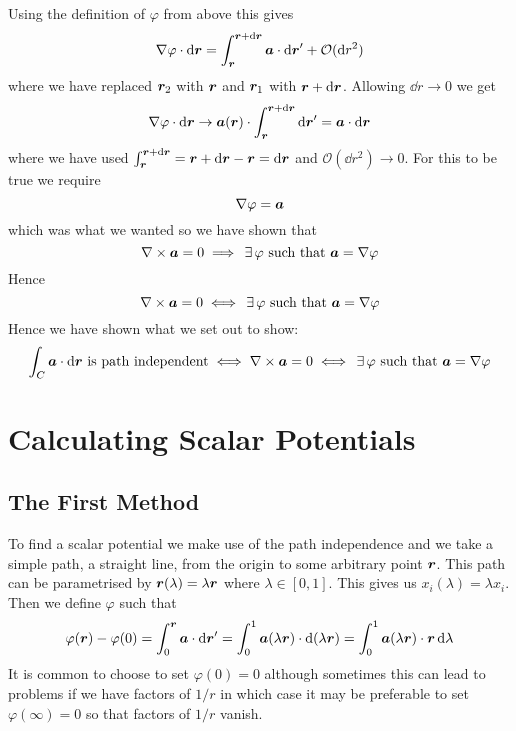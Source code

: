 \documentclass{article}
\begin{document}
    Using the definition of \(\varphi\) from above this gives
    \[\nabla\varphi\cdot\dd\bm{r} = \int^{\bm{r} + \dd\bm{r}}_{\bm{r}}\bm{a}\cdot\dd\bm{r}' + \mathcal{O}(\dd r^2)\]
    where we have replaced \(\bm{r}_2\) with \(\bm{r}\) and \(\bm{r}_1\) with \(\bm{r} + \dd\bm{r}\).
    Allowing \(\dd r\to 0\) we get
    \[\nabla\varphi\cdot\dd\bm{r} \to \bm{a}(\bm{r})\cdot\int_{\bm{r}}^{\bm{r} + \dd\bm{r}}\dd\bm{r}' = \bm{a}\cdot\dd\bm{r}\]
    where we have used \(\int_{\bm{r}}^{\bm{r} + \dd\bm{r}} = \bm{r} + \dd\bm{r} - \bm{r} = \dd\bm{r}\) and \(\mathcal{O}(\dd r^2)\to 0\).
    For this to be true we require
    \[\nabla\varphi = \bm{a}\]
    which was what we wanted so we have shown that
    \[\nabla\times\bm{a} = 0 \implies \,\exists\,\varphi\text{ such that }\bm{a} = \nabla\varphi\]
    Hence
    \[\nabla\times\bm{a} = 0 \iff \,\exists\,\varphi\text{ such that }\bm{a} = \nabla\varphi\]
    Hence we have shown what we set out to show:
    \[\int_C\bm{a}\cdot\dd\bm{r}\text{ is path independent}\iff \nabla\times\bm{a} = 0 \iff \,\exists\, \varphi\text{ such that }\bm{a} = \nabla\varphi\]
    
    \section{Calculating Scalar Potentials}
    \subsection{The First Method}
    To find a scalar potential we make use of the path independence and we take a simple path, a straight line, from the origin to some arbitrary point \(\bm{r}\).
    This path can be parametrised by \(\bm{r}(\lambda) = \lambda\bm{r}\) where \(\lambda\in[0, 1]\).
    This gives us \(x_i(\lambda) = \lambda x_i\).
    Then we define \(\varphi\) such that
    \[\varphi(\bm{r}) - \varphi(0) = \int_0^{\bm{r}}\bm{a}\cdot\dd\bm{r}' = \int_0^1\bm{a}(\lambda\bm{r})\cdot\dd(\lambda\bm{r}) = \int_0^1\bm{a}(\lambda\bm{r})\cdot\bm{r}\,\dd\lambda\]
    It is common to choose to set \(\varphi(0) = 0\) although sometimes this can lead to problems if we have factors of \(1/r\) in which case it may be preferable to set \(\varphi(\infty) = 0\) so that factors of \(1/r\) vanish.
    
\end{document}
